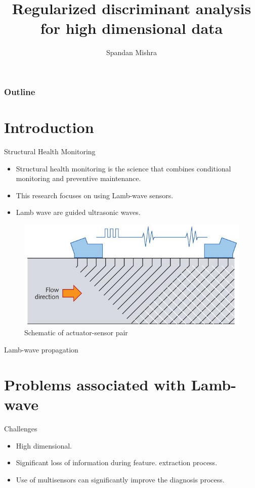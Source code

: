 \documentclass[11pt]{beamer}
\author{Spandan Mishra}
\title{Regularized discriminant analysis for high dimensional data}
\institute{Florida State University}
\date{}
\begin{document}
\begin{frame}
\titlepage
\end{frame}
\begin{frame}
	\frametitle{Outline}
	\tableofcontents
\end{frame}

\section{Introduction}
\begin{frame}{Structural Health Monitoring}
\begin{itemize}
\item Structural health monitoring is the science that combines conditional monitoring and preventive maintenance.
\item This research focuses on using Lamb-wave sensors.
\item Lamb wave are guided ultrasonic waves.
\end{itemize}
\end{frame}

\begin{frame}[allowframebreaks]
\begin{figure}
\centering
\includegraphics[scale=0.6]{figure/Lambsensors.jpg} 
\caption{ Schematic of actuator-sensor pair}
\end{figure}
\end{frame}
\begin{frame}{Lamb-wave propagation}
\begin{figure}
\end{figure}
\end{frame}
\section{Problems associated with Lamb-wave}
\begin{frame}{Challenges}
\begin{itemize}
\item High dimensional.
\item Significant loss of information during feature.
 extraction process.
\item Use of multisensors can significantly improve the diagnosis process.
\end{itemize}
\end{frame}
\end{document}

